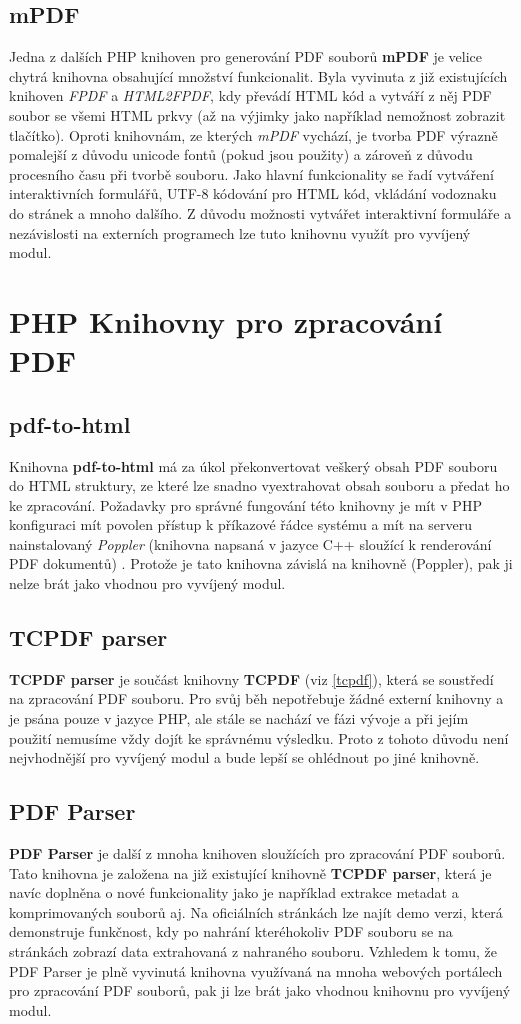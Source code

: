 		\subsection{mPDF}
Jedna z dalších PHP knihoven pro generování PDF souborů \textbf{mPDF} je velice chytrá knihovna obsahující množství funkcionalit. Byla vyvinuta z již existujících knihoven \textit{FPDF} a \textit{HTML2FPDF}, kdy převádí HTML kód a vytváří z něj PDF soubor se všemi HTML prkvy (až na výjimky jako například nemožnost zobrazit tlačítko). Oproti knihovnám, ze kterých \textit{mPDF} vychází, je tvorba PDF výrazně pomalejší z důvodu unicode fontů (pokud jsou použity) a zároveň z důvodu procesního času při tvorbě souboru. Jako hlavní funkcionality se řadí vytváření interaktivních formulářů, UTF-8 kódování pro HTML kód, vkládání vodoznaku do stránek a mnoho dalšího. Z důvodu možnosti vytvářet interaktivní formuláře a nezávislosti na externích programech lze tuto knihovnu využít pro vyvíjený modul.
	\section{PHP Knihovny pro zpracování PDF}
		\subsection{pdf-to-html}
Knihovna \textbf{pdf-to-html} má za úkol překonvertovat veškerý obsah PDF souboru do HTML struktury, ze které lze snadno vyextrahovat obsah souboru a předat ho ke zpracování. Požadavky pro správné fungování této knihovny je mít v PHP konfiguraci mít povolen přístup k příkazové řádce systému a mít na serveru nainstalovaný \textit{Poppler} (knihovna napsaná v jazyce C++ sloužící k renderování PDF dokumentů) \cite{pdfToHtml}. Protože je tato knihovna závislá na knihovně (Poppler), pak ji nelze brát jako vhodnou pro vyvíjený modul. 
		\subsection{TCPDF parser}
\textbf{TCPDF parser} je součást knihovny \textbf{TCPDF} (viz \ref{tcpdf}), která se soustředí na zpracování PDF souboru. Pro svůj běh nepotřebuje žádné externí knihovny a je psána pouze v jazyce PHP, ale stále se nachází ve fázi vývoje a při jejím použití nemusíme vždy dojít ke správnému výsledku. Proto z tohoto důvodu není nejvhodnější pro vyvíjený modul a bude lepší se ohlédnout po jiné knihovně.
		\subsection{PDF Parser}
\textbf{PDF Parser} je další z mnoha knihoven sloužících pro zpracování PDF souborů. Tato knihovna je založena na již existující knihovně \textbf{TCPDF parser}, která je navíc doplněna o nové funkcionality jako je například extrakce metadat a komprimovaných souborů aj. Na oficiálních stránkách lze najít demo verzi, která demonstruje funkčnost, kdy po nahrání kteréhokoliv PDF souboru se na stránkách zobrazí data extrahovaná z nahraného souboru. Vzhledem k tomu, že PDF Parser je plně vyvinutá knihovna využívaná na mnoha webových portálech pro zpracování PDF souborů, pak ji lze brát jako vhodnou knihovnu pro vyvíjený modul.
